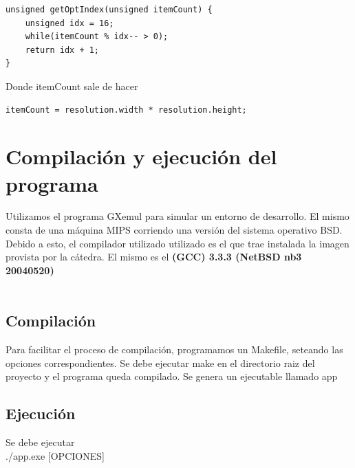 \documentclass [12pt, a4paper]{article}
\begin{document}
	\begin{lstlisting}[frame=single]
unsigned getOptIndex(unsigned itemCount) {
	unsigned idx = 16;
	while(itemCount % idx-- > 0);
	return idx + 1;
}
	\end{lstlisting}
	\vspace{5mm} Donde itemCount sale de hacer
	\begin{lstlisting}[frame=single]
itemCount = resolution.width * resolution.height;
	\end{lstlisting}	
	\clearpage
	\section{Compilación y ejecución del programa}
	
	Utilizamos el programa GXemul para simular un entorno de desarrollo. El mismo consta de una máquina MIPS corriendo una versión del sistema operativo BSD. Debido a esto, el compilador utilizado utilizado es el que trae instalada la imagen provista por la cátedra. El mismo es el \textbf{(GCC) 3.3.3 (NetBSD nb3 20040520)}
	\\\\
	\subsection{Compilación}
	Para facilitar el proceso de compilación, programamos un Makefile, seteando las opciones correspondientes. Se debe ejecutar make en el directorio raiz del proyecto y el programa queda compilado. Se genera un ejecutable llamado app
	\subsection{Ejecución}
	Se debe ejecutar\\
	./app.exe [OPCIONES]\\
	
\end{document}
